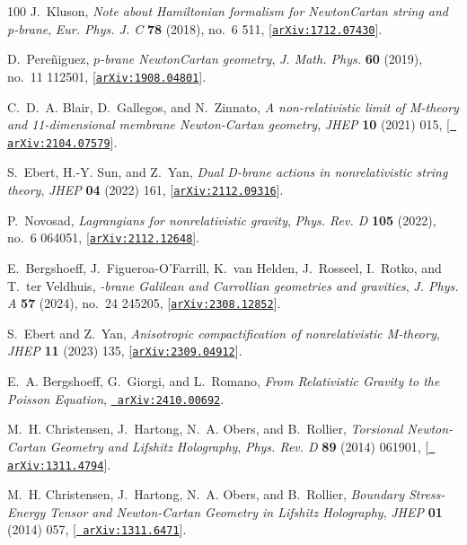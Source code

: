 \documentclass[11pt]{article}
\begin{document}
\begin{thebibliography}{100}
J.~Kluson, {\it {Note about Hamiltonian formalism for Newton\textendash{}Cartan
  string and p-brane}},  {\em Eur. Phys. J. C} {\bf 78} (2018), no.~6 511,
  [\href{http://arxiv.org/abs/1712.07430}{{\tt arXiv:1712.07430}}].

D.~Pere\~niguez, {\it {$p$-brane Newton\textendash{}Cartan geometry}},  {\em J.
  Math. Phys.} {\bf 60} (2019), no.~11 112501,
  [\href{http://arxiv.org/abs/1908.04801}{{\tt arXiv:1908.04801}}].

C.~D.~A. Blair, D.~Gallegos, and N.~Zinnato, {\it {A non-relativistic limit of
  M-theory and 11-dimensional membrane Newton-Cartan geometry}},  {\em JHEP}
  {\bf 10} (2021) 015, [\href{http://arxiv.org/abs/2104.07579}{{\tt
  arXiv:2104.07579}}].

S.~Ebert, H.-Y. Sun, and Z.~Yan, {\it {Dual D-brane actions in nonrelativistic
  string theory}},  {\em JHEP} {\bf 04} (2022) 161,
  [\href{http://arxiv.org/abs/2112.09316}{{\tt arXiv:2112.09316}}].

P.~Novosad, {\it {Lagrangians for nonrelativistic gravity}},  {\em Phys. Rev.
  D} {\bf 105} (2022), no.~6 064051,
  [\href{http://arxiv.org/abs/2112.12648}{{\tt arXiv:2112.12648}}].

E.~Bergshoeff, J.~Figueroa-O'Farrill, K.~van Helden, J.~Rosseel, I.~Rotko, and
  T.~ter Veldhuis, {\it {-brane Galilean and Carrollian geometries and
  gravities}},  {\em J. Phys. A} {\bf 57} (2024), no.~24 245205,
  [\href{http://arxiv.org/abs/2308.12852}{{\tt arXiv:2308.12852}}].

S.~Ebert and Z.~Yan, {\it {Anisotropic compactification of nonrelativistic
  M-theory}},  {\em JHEP} {\bf 11} (2023) 135,
  [\href{http://arxiv.org/abs/2309.04912}{{\tt arXiv:2309.04912}}].

E.~A. Bergshoeff, G.~Giorgi, and L.~Romano, {\it {From Relativistic Gravity to
  the Poisson Equation}},  \href{http://arxiv.org/abs/2410.00692}{{\tt
  arXiv:2410.00692}}.

M.~H. Christensen, J.~Hartong, N.~A. Obers, and B.~Rollier, {\it {Torsional
  Newton-Cartan Geometry and Lifshitz Holography}},  {\em Phys. Rev. D} {\bf
  89} (2014) 061901, [\href{http://arxiv.org/abs/1311.4794}{{\tt
  arXiv:1311.4794}}].

M.~H. Christensen, J.~Hartong, N.~A. Obers, and B.~Rollier, {\it {Boundary
  Stress-Energy Tensor and Newton-Cartan Geometry in Lifshitz Holography}},
  {\em JHEP} {\bf 01} (2014) 057, [\href{http://arxiv.org/abs/1311.6471}{{\tt
  arXiv:1311.6471}}].


\end{thebibliography}
\end{document}
